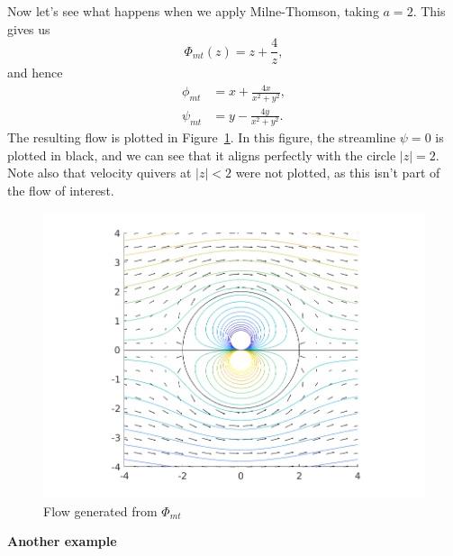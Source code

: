 \documentclass{article}
\begin{document}
Now let's see what happens when we apply Milne-Thomson, taking $a = 2$. This gives us
%
\begin{equation*}
    \Phi_{mt}(z) = z + \frac{4}{z}
    ,
\end{equation*}
%
and hence
%
\begin{align*}
    \phi_{mt} &= x + \frac{4 x}{x^2 + y^2}, \\
    \psi_{mt} &= y - \frac{4 y}{x^2 + y^2}
    .
\end{align*}
%
The resulting flow is plotted in Figure~\ref{fig:mt-2}. In this figure,
the streamline $\psi = 0$ is plotted in black, and we can see that it
aligns perfectly with the circle $|z| = 2$. Note also that velocity
quivers at $|z| < 2$ were not plotted, as this isn't part of the flow of
interest.
%
\begin{figure}[ht]
    \includegraphics[width=35em]{mt_ex1_2}
    \centering
    \caption{Flow generated from $\Phi_{mt}$}
    \label{fig:mt-2}
\end{figure}

\textbf{Another example}
\end{document}
